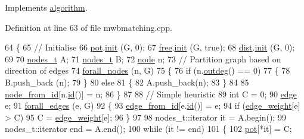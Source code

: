 Implements \mbox{\hyperlink{classalgorithm_a734b189509a8d6b56b65f8ff772d43ca}{algorithm}}.



Definition at line 63 of file mwbmatching.\+cpp.


\begin{DoxyCode}
64 \{
65     \textcolor{comment}{// Initialise}
66     \mbox{\hyperlink{classmwbmatching_ac44514154909580323c5d2e5c58e7d23}{pot}}.\mbox{\hyperlink{classne__map_a4ef2ab4aebcb57a7a101975bf6a88e24}{init}} (G, 0);
67     \mbox{\hyperlink{classmwbmatching_a109911f7997e2f1b3293e505deb4a4cb}{free}}.\mbox{\hyperlink{classne__map_a4ef2ab4aebcb57a7a101975bf6a88e24}{init}} (G, \textcolor{keyword}{true});
68     \mbox{\hyperlink{classmwbmatching_aad0fd09452bf87f0e8e95c74441f5e8a}{dist}}.\mbox{\hyperlink{classne__map_a4ef2ab4aebcb57a7a101975bf6a88e24}{init}} (G, 0);
69     
70     \mbox{\hyperlink{edge_8h_a22ac17689106ba21a84e7bc54d1199d6}{nodes\_t}} A;
71     \mbox{\hyperlink{edge_8h_a22ac17689106ba21a84e7bc54d1199d6}{nodes\_t}} B;
72     \mbox{\hyperlink{classnode}{node}} n;
73     \textcolor{comment}{// Partition graph based on direction of edges}
74     \mbox{\hyperlink{graph_8h_a1905bf4c6aa7167b9ee5a2e72f12ad2d}{forall\_nodes}} (n, G)
75     \{
76         \textcolor{keywordflow}{if} (n.\mbox{\hyperlink{classnode_a32adc45c4132e2642ccd2233d79ffe67}{outdeg}}() == 0)
77         \{
78             B.push\_back (n);
79         \}
80         \textcolor{keywordflow}{else}
81         \{
82             A.push\_back(n);
83         \}
84         
85         \mbox{\hyperlink{classmwbmatching_a805077195aac6c443b753b74da814c6f}{node\_from\_id}}[n.\mbox{\hyperlink{classnode_a5d38b4152c3cedb235e45de7eb3f4469}{id}}()] = n;
86     \}
87     
88     \textcolor{comment}{// Simple heuristic}
89     \textcolor{keywordtype}{int} C = 0;
90     \mbox{\hyperlink{classedge}{edge}} e;
91     \mbox{\hyperlink{graph_8h_ac57b09543204dcb7a1e2c76c793cf038}{forall\_edges}} (e, G)
92     \{
93         \mbox{\hyperlink{classmwbmatching_afebc731e1dd5a37df6467258bfe07887}{edge\_from\_id}}[e.\mbox{\hyperlink{classedge_aa7635988ab396748d6081ae5d273923b}{id}}()] = e;
94         \textcolor{keywordflow}{if} (\mbox{\hyperlink{classmwbmatching_a9624508c4944bffc6a349aa76ce6964c}{edge\_weight}}[e] > C) 
95             C = \mbox{\hyperlink{classmwbmatching_a9624508c4944bffc6a349aa76ce6964c}{edge\_weight}}[e];  
96     \}
97 
98     nodes\_t::iterator it = A.begin();
99     nodes\_t::iterator end = A.end();
100     \textcolor{keywordflow}{while} (it != end)
101     \{
102         \mbox{\hyperlink{classmwbmatching_ac44514154909580323c5d2e5c58e7d23}{pot}}[*it] = C;

\end{DoxyCode}
